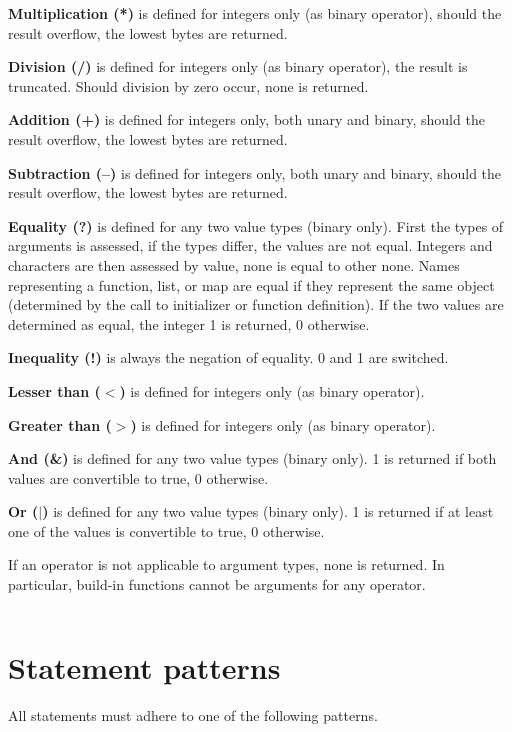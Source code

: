 \documentclass[a4paper,11pt,openany]{article}
\begin{document}
\textbf{Multiplication (*)} is defined for integers only (as binary operator), should the result overflow, the lowest bytes are returned.

\textbf{Division (/)} is defined for integers only (as binary operator), the result is truncated. Should division by zero occur, none is returned.

\textbf{Addition (+)} is defined for integers only, both unary and binary, should the result overflow, the lowest bytes are returned.

\textbf{Subtraction (--)} is defined for integers only, both unary and binary, should the result overflow, the lowest bytes are returned.

\textbf{Equality (?)} is defined for any two value types (binary only). First the types of arguments is assessed, if the types differ, the values are not equal. Integers and characters are then assessed by value, none is equal to other none. Names representing a function, list, or map are equal if they represent the same object (determined by the call to initializer or function definition). If the two values are determined as equal, the integer 1 is returned, 0 otherwise.

\textbf{Inequality (!)} is always the negation of equality. 0 and 1 are switched.

\textbf{Lesser than ($<$)} is defined for integers only (as binary operator).

\textbf{Greater than ($>$)} is defined for integers only (as binary operator).

\textbf{And (\&)} is defined for any two value types (binary only). 1 is returned if both values are convertible to true, 0 otherwise.

\textbf{Or ($|$)} is defined for any two value types (binary only). 1 is returned if at least one of the values is convertible to true, 0 otherwise.

If an operator is not applicable to argument types, none is returned. In particular, build-in functions cannot be arguments for any operator.

\begin{lstlisting}[frame=none]

\end{lstlisting}

\section{Statement patterns}

All statements must adhere to one of the following patterns.
\end{document}
